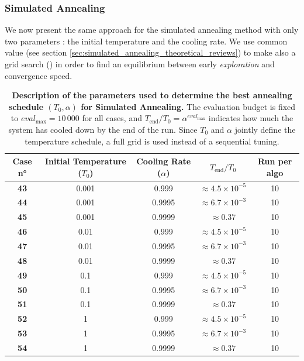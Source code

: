 \documentclass[12pt, openany]{article}
\begin{document}
\subsubsection{Simulated Annealing}\label{sec:cases_sa}

We now present the same approach for the simulated annealing method with only two parameters : the initial temperature and the cooling rate. We use common value (see section \ref{sec:simulated_annealing_theoretical_reviews}) to make also a grid search () in order to find an equilibrium between early \emph{exploration} and convergence speed.

\begin{table}[H]
    \centering
    \renewcommand{\arraystretch}{1.5}
    \begin{tabular}{|c|c|c|c|c|}
        \hline 
        \textbf{Case n°} & \textbf{Initial Temperature ($T_0$)} & \textbf{Cooling Rate ($\alpha$)} & $T_{\text{end}}/T_0$ & \textbf{Run per algo} \\ \hline

        \textbf{43} & 0.001 & 0.999  & $\approx 4.5\times10^{-5}$ & 10 \\ \hdashline
        \textbf{44} & 0.001 & 0.9995 & $\approx 6.7\times10^{-3}$ & 10 \\ \hdashline
        \textbf{45} & 0.001 & 0.9999 & $\approx 0.37$ & 10 \\ \hdashline
        \textbf{46} & 0.01  & 0.999  & $\approx 4.5\times10^{-5}$ & 10 \\ \hdashline
        \textbf{47} & 0.01  & 0.9995 & $\approx 6.7\times10^{-3}$ & 10 \\ \hdashline
        \textbf{48} & 0.01  & 0.9999 & $\approx 0.37$ & 10 \\ \hdashline
        \textbf{49} & 0.1   & 0.999  & $\approx 4.5\times10^{-5}$ & 10 \\ \hdashline
        \textbf{50} & 0.1   & 0.9995 & $\approx 6.7\times10^{-3}$ & 10 \\ \hdashline
        \textbf{51} & 0.1   & 0.9999 & $\approx 0.37$ & 10 \\ \hdashline
        \textbf{52} & 1     & 0.999  & $\approx 4.5\times10^{-5}$ & 10 \\ \hdashline
        \textbf{53} & 1     & 0.9995 & $\approx 6.7\times10^{-3}$ & 10 \\ \hdashline
        \textbf{54} & 1     & 0.9999 & $\approx 0.37$ & 10 \\ 
        \hline
    \end{tabular}
    \caption{\textbf{Description of the parameters used to determine the best annealing schedule $(T_0, \alpha)$ for Simulated Annealing.} The evaluation budget is fixed to $eval_{\max} = 10\,000$ for all cases, and $T_{\text{end}}/T_0 = \alpha^{eval_{\max}}$ indicates how much the system has cooled down by the end of the run. Since $T_0$ and $\alpha$ jointly define the temperature schedule, a full grid is used instead of a sequential tuning.}
    \label{tab:Cases_Determine_SA_Schedule}
\end{table}
\end{document}
